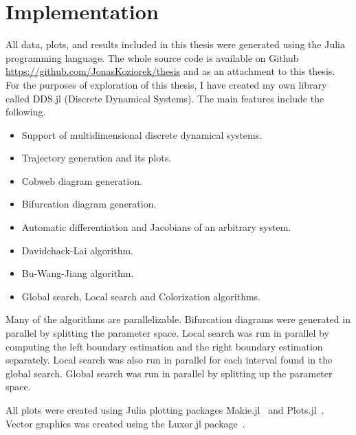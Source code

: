 \section{Implementation}
All data, plots, and results included in this thesis were generated using the Julia programming language.
The whole source code is available on Github \url{https://github.com/JonasKoziorek/thesis} and as an attachment to this thesis.
For the purposes of exploration of this thesis, I have created my own library called DDS.jl (Discrete Dynamical Systems).
The main features include the following.
\begin{itemize}
    \item Support of multidimensional discrete dynamical systems.
    \item Trajectory generation and its plots.
    \item Cobweb diagram generation.
    \item Bifurcation diagram generation.
    \item Automatic differentiation and Jacobians of an arbitrary system.
    \item Davidchack-Lai algorithm.
    \item Bu-Wang-Jiang algorithm.
    \item Global search, Local search and Colorization algorithms.
\end{itemize}
Many of the algorithms are parallelizable.
Bifurcation diagrams were generated in parallel by splitting the parameter space.
Local search was run in parallel by computing the left boundary estimation and the right boundary estimation separately.
Local search was also run in parallel for each interval found in the global search.
Global search was run in parallel by splitting up the parameter space.
\par
All plots were created using Julia plotting packages Makie.jl~\cite{Danisch2021} and Plots.jl~\cite{Christ2022}.
Vector graphics was created using the Luxor.jl package~\cite{Luxor2024}.

\endinput